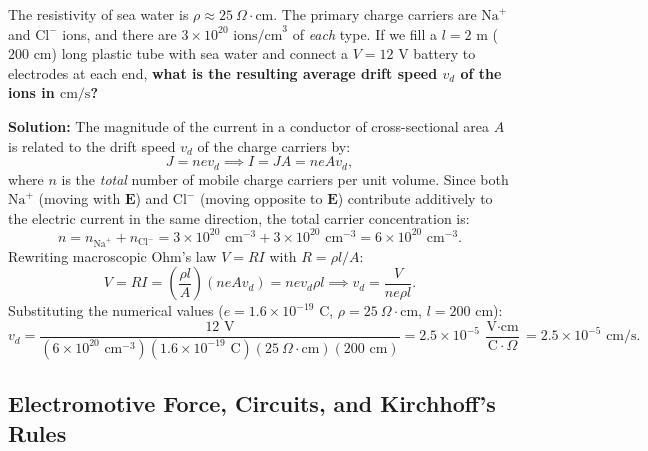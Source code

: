 \begin{example}
The resistivity of sea water is $\rho \approx 25\ \Omega \cdot \text{cm}$. The primary charge carriers are $\text{Na}^+$ and $\text{Cl}^-$ ions, and there are $3 \times 10^{20}\text{ ions/cm}^3$ of \emph{each} type. If we fill a $l = 2\text{ m}$ ($200\text{ cm}$) long plastic tube with sea water and connect a $V = 12\text{ V}$ battery to electrodes at each end, \textbf{what is the resulting average drift speed $v_d$ of the ions in $\text{cm/s}$?}

\textbf{Solution:}
The magnitude of the current in a conductor of cross-sectional area $A$ is related to the drift speed $v_d$ of the charge carriers by:
\begin{equation*}
    J = n e v_d \implies I = J A = n e A v_d,
\end{equation*}
where $n$ is the \emph{total} number of mobile charge carriers per unit volume. Since both $\text{Na}^+$ (moving with $\bm{E}$) and $\text{Cl}^-$ (moving opposite to $\bm{E}$) contribute additively to the electric current in the same direction, the total carrier concentration is:
\begin{equation*}
    n = n_{\text{Na}^+} + n_{\text{Cl}^-} = 3 \times 10^{20}\text{ cm}^{-3} + 3 \times 10^{20}\text{ cm}^{-3} = 6 \times 10^{20}\text{ cm}^{-3}.
\end{equation*}
Rewriting macroscopic Ohm's law $V = R I$ with $R = \rho l / A$:
\begin{equation*}
    V = R I = \left( \frac{\rho l}{A} \right) (n e A v_d) = n e v_d \rho l \implies v_d = \frac{V}{n e \rho l}.
\end{equation*}
Substituting the numerical values ($e = 1.6 \times 10^{-19}\text{ C}$, $\rho = 25\ \Omega\cdot\text{cm}$, $l = 200\text{ cm}$):
\begin{equation}
    v_d = \frac{12\text{ V}}{\left(6 \times 10^{20}\text{ cm}^{-3}\right) \left(1.6 \times 10^{-19}\text{ C}\right) \left(25\ \Omega\cdot\text{cm}\right) \left(200\text{ cm}\right)} = 2.5 \times 10^{-5}\ \frac{\text{V}\cdot\text{cm}}{\text{C}\cdot\Omega} = 2.5 \times 10^{-5}\text{ cm/s}.
\end{equation}
\end{example}

\newpage
\subsection{Electromotive Force, Circuits, and Kirchhoff's Rules}

